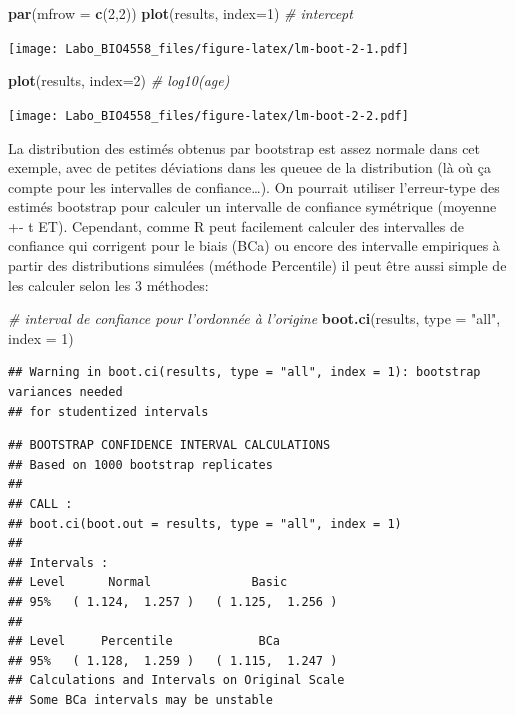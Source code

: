 \documentclass[12pt,]{book}
\newenvironment{Shaded}{\begin{snugshade}}{\end{snugshade}}
\newcommand{\CommentTok}[1]{\textcolor[rgb]{0.37,0.37,0.37}{\textit{#1}}}
\newcommand{\DataTypeTok}[1]{\textcolor[rgb]{0.27,0.27,0.27}{#1}}
\newcommand{\DecValTok}[1]{\textcolor[rgb]{0.06,0.06,0.06}{#1}}
\newcommand{\KeywordTok}[1]{\textcolor[rgb]{0.27,0.27,0.27}{\textbf{#1}}}
\newcommand{\NormalTok}[1]{#1}
\newcommand{\StringTok}[1]{\textcolor[rgb]{0.5,0.5,0.5}{#1}}
\begin{document}
\begin{Shaded}
\begin{Highlighting}[]
\KeywordTok{par}\NormalTok{(}\DataTypeTok{mfrow =} \KeywordTok{c}\NormalTok{(}\DecValTok{2}\NormalTok{,}\DecValTok{2}\NormalTok{))}
\KeywordTok{plot}\NormalTok{(results, }\DataTypeTok{index=}\DecValTok{1}\NormalTok{) }\CommentTok{# intercept}
\end{Highlighting}
\end{Shaded}

\texttt{[image: Labo\_BIO4558\_files/figure-latex/lm-boot-2-1.pdf]}

\begin{Shaded}
\begin{Highlighting}[]
\KeywordTok{plot}\NormalTok{(results, }\DataTypeTok{index=}\DecValTok{2}\NormalTok{) }\CommentTok{# log10(age)}
\end{Highlighting}
\end{Shaded}

\texttt{[image: Labo\_BIO4558\_files/figure-latex/lm-boot-2-2.pdf]}

La distribution des estimés obtenus par bootstrap est assez normale dans cet exemple, avec de petites déviations dans les queuee de la distribution (là où ça compte pour les intervalles de confiance\ldots{}). On pourrait utiliser l'erreur-type des estimés bootstrap pour calculer un intervalle de confiance symétrique (moyenne +- t ET). Cependant, comme R peut facilement calculer des intervalles de confiance qui corrigent pour le biais (BCa) ou encore des intervalle empiriques à partir des distributions simulées (méthode Percentile) il peut être aussi simple de les calculer selon les 3 méthodes:

\begin{Shaded}
\begin{Highlighting}[]
\CommentTok{# interval de confiance pour l'ordonnée à l'origine}
\KeywordTok{boot.ci}\NormalTok{(results, }\DataTypeTok{type =} \StringTok{"all"}\NormalTok{, }\DataTypeTok{index =} \DecValTok{1}\NormalTok{)}
\end{Highlighting}
\end{Shaded}

\begin{verbatim}
## Warning in boot.ci(results, type = "all", index = 1): bootstrap variances needed
## for studentized intervals
\end{verbatim}

\begin{verbatim}
## BOOTSTRAP CONFIDENCE INTERVAL CALCULATIONS
## Based on 1000 bootstrap replicates
## 
## CALL : 
## boot.ci(boot.out = results, type = "all", index = 1)
## 
## Intervals : 
## Level      Normal              Basic         
## 95%   ( 1.124,  1.257 )   ( 1.125,  1.256 )  
## 
## Level     Percentile            BCa          
## 95%   ( 1.128,  1.259 )   ( 1.115,  1.247 )  
## Calculations and Intervals on Original Scale
## Some BCa intervals may be unstable
\end{verbatim}
\end{document}
